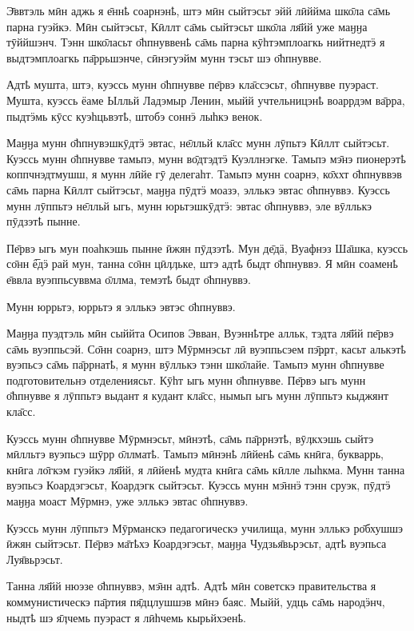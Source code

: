 \documentclass[10pt, a5paper,openany,twoside]{ksdp}
\begin{document}
 \setlength{\RaggedRightParindent}{.5cm}\begin{RaggedRight}

\noindent Э̄ввтэль мӣн аджь я е̄ннҍ соарнэнҍ, штэ мӣн сыйтэсьт эйй лӣййма шко̄ла са̄мь парна гуэйкэ. Мӣн сыйтэсьт, Кӣллт са̄мь сыйтэсьт шко̄ла ля̄йй уже маӈӈа тӯййшэнч. Тэнн шко̄ласьт о̄һпнуввенҍ са̄мь парна кӯһтэмплоагкь нийтнедтӭ я выдтэмплоагкь па̄ррьшэнче, сӣнэгуэйм мунн тэсьт шэ о̄һпнувве. 

Адтҍ мушта, штэ, куэссь мунн о̄һпнувве пе̄рвэ кла̄ссэсьт, о̄һпнувве пуэраст. Мушта, куэссь ёаме Ылльй Ладэмыр Ленин, мыйй учтельницэнҍ воаррдэм ва̄рра, пыдтӭмь кӯсс куэһцьвэтҍ, штобэ соннӭ лыһкэ венок. 

Маӈӈа мунн о̄һпнувэшкӯдтӭ эвтас, не̄лльй кла̄сс мунн лӯпьтэ Кӣллт сыйтэсьт. Куэссь мунн о̄һпнувве тамьпэ, мунн во̄дтэдтӭ Куэллнэгке. Тамьпэ мэ̄нэ пионерэтҍ коппчнэдтмушш, я мунн лӣйе гӯ делегаһт. Тамьпэ мунн соарнэ, ко̄ххт о̄һпнуввэв са̄мь парна Кӣллт сыйтэсьт, маӈӈа пӯдтӭ моазэ, эллькэ эвтас о̄һпнуввэ. Куэссь мунн лӯппьтэ не̄лльй ыгь, мунн юрьтэшкӯдтӭ: эвтас о̄һпнуввэ, эле вӯллькэ пӯдзэтҍ пынне. 

Пе̄рвэ ыгь мун поаһкэшь пынне ӣжян пӯдзэтҍ. Мун де̄дӓ, Вуафнэз Ша̄шка, куэссь со̄нн ё̅дӭ рай мун, танна со̄нн цӣӆӆьке, штэ адтҍ быдт о̄һпнуввэ. Я мӣн соаменҍ е̄ввла вуэппьсуввма о̄ллма, темэтҍ быдт о̄һпнуввэ. 

Мунн юррьтэ, юррьтэ я эллькэ эвтэс о̄һпнуввэ. 

Маӈӈа пуэдтэль мӣн сыййта Осипов Эвван, Вуэннҍтре алльк, тэдта ля̄йй пе̄рвэ са̄мь вуэппьсэй. Со̄нн соарнэ, штэ Мӯрмнэсьт лӣ вуэппьсэем пэ̄ҏҏт, касьт алькэтҍ вуэпьсэ са̄мь па̄ррнатҍ, я мунн вӯллькэ тэнн шко̄лайе. Тамьпэ мунн о̄һпнувве подготовительнэ отделениясьт. Кӯһт ыгь мунн о̄һпнувве. Пе̄рвэ ыгь мунн о̄һпнувве я лӯппьтэ выдант я кудант кла̄сс, нымьп ыгь мунн лӯппьтэ кыджянт кла̄сс. 

Куэссь мунн о̄һпнувве Мӯрмнэсьт, мӣнэтҍ, са̄мь па̄ррнэтҍ, вӯӆкхэшь сыйтэ мӣлльтэ вуэпьсэ шӯрр о̄ллматҍ. Тамьпэ мӣнэнҍ лӣйенҍ са̄мь кнӣга, букваррь, кнӣга ло̄гкэм гуэйкэ ля̄йй, я лӣйенҍ мудта кнӣга са̄мь кӣлле лыһкма. Мунн танна вуэпьсэ Коардэгэсьт, Коардэгк сыйтэсьт. Куэссь мунн мэ̄ннӭ тэнн сруэк, пӯдтӭ маӈӈа моаст Мӯрмнэ, уже эллькэ эвтас о̄һпнуввэ. 

Куэссь мунн лӯппьтэ Мӯрманскэ педагогическэ училища, мунн эллькэ ро̄бхушшэ ӣжян сыйтэсьт. Пе̄рвэ ма̄тҍхэ Коардэгэсьт, маӈӈа Чудзья̄вьрэсьт, адтҍ вуэпьса Луя̄вьрэсьт. 

Танна ля̄йй нюэзе о̄һпнуввэ, мэ̄нн адтҍ. Адтҍ мӣн советскэ правительства я коммунистическэ па̄ртия пя̄дцлушшэв мӣнэ баяс. Мыйй, удць са̄мь народӭнч, ныдтҍ шэ я̄ӆчемь пуэраст я лӣһчемь кырьйхэенҍ. 


\end{RaggedRight}
\end{document}
